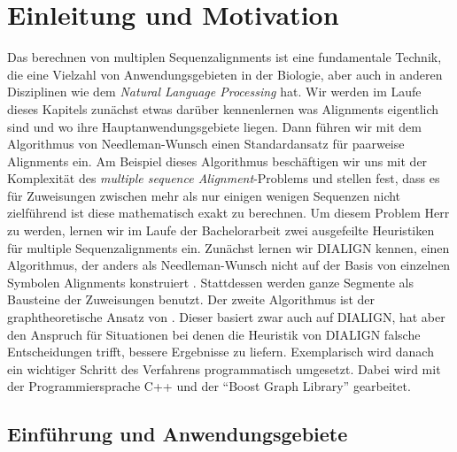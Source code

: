 \chapter{Einleitung und Motivation}
\label{ch:einleitung}

Das berechnen von multiplen Sequenzalignments ist eine fundamentale Technik, die eine Vielzahl von Anwendungsgebieten in der Biologie, aber auch in anderen Disziplinen wie dem \emph{Natural Language Processing} hat. Wir werden im Laufe dieses Kapitels zunächst etwas darüber kennenlernen was Alignments eigentlich sind  und wo ihre Hauptanwendungsgebiete liegen. Dann führen wir mit dem Algorithmus von Needleman-Wunsch einen Standardansatz für paarweise Alignments ein. Am Beispiel dieses Algorithmus beschäftigen wir uns mit der Komplexität des \emph{multiple sequence Alignment}-Problems und stellen fest, dass es für Zuweisungen zwischen mehr als nur einigen wenigen Sequenzen nicht zielführend ist diese mathematisch exakt zu berechnen. Um diesem Problem Herr zu werden, lernen wir im Laufe der Bachelorarbeit zwei ausgefeilte Heuristiken für multiple Sequenzalignments ein. Zunächst lernen wir DIALIGN kennen, einen Algorithmus, der anders als Needleman-Wunsch nicht auf der Basis von einzelnen Symbolen Alignments konstruiert \citep{mdw96}. Stattdessen werden ganze Segmente als Bausteine der Zuweisungen benutzt. Der zweite Algorithmus ist der graphtheoretische Ansatz von \cite{cpm10}. Dieser basiert zwar auch auf DIALIGN, hat aber den Anspruch für Situationen bei denen die Heuristik von DIALIGN falsche Entscheidungen trifft, bessere Ergebnisse zu liefern. Exemplarisch wird danach ein wichtiger Schritt des Verfahrens programmatisch umgesetzt. Dabei wird mit der Programmiersprache C++ und der \enquote{Boost Graph Library} gearbeitet.

\section{Einführung und Anwendungsgebiete}

